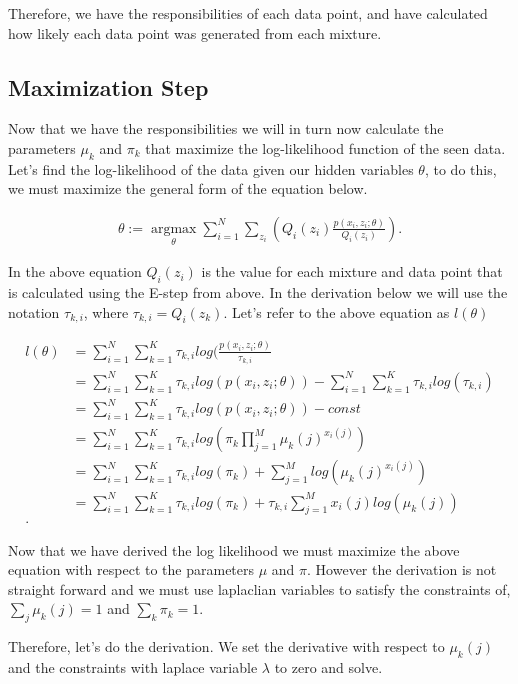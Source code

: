 \documentclass[paper=a4, fontsize=11pt]{scrartcl} %
\begin{document}
Therefore, we have the responsibilities of each data point, and have calculated how likely each data point was generated from each mixture.

\subsection{Maximization Step}
Now that we have the responsibilities we will in turn now calculate the parameters $\mu_k$ and $\pi_k$ that maximize the log-likelihood function of the seen data.
Let's find the log-likelihood of the data given our hidden variables $\theta$, to do this, we must maximize the general form of the equation below.

\begin{align}
\theta := \underset{\theta}{\operatorname{argmax}}\sum_{i=1}^N \sum_{z_i}(Q_i(z_i)\frac{p(x_i,z_i;\theta)}{Q_i(z_i)}).
\end{align}

In the above equation $Q_i(z_i)$ is the value for each mixture and data point that is calculated using the E-step from above.
In the derivation below we will use the notation $\tau_{k,i}$, where $\tau_{k,i} = Q_i(z_k)$.
Let's refer to the above equation as $l(\theta)$

\begin{align}
l(\theta) &= \sum_{i=1}^N \sum_{k=1}^K \tau_{k,i} log(\frac{p(x_i,z_i;\theta)}{\tau_{k,i}} \\
&= \sum_{i=1}^N \sum_{k=1}^K \tau_{k,i} log(p(x_i,z_i;\theta)) -  \sum_{i=1}^N \sum_{k=1}^K \tau_{k,i} log( \tau_{k,i}) \\
&= \sum_{i=1}^N \sum_{k=1}^K \tau_{k,i} log(p(x_i,z_i;\theta)) -  const \\
&=  \sum_{i=1}^N \sum_{k=1}^K \tau_{k,i} log( \pi_k\prod_{j=1}^M \mu_k(j)^{x_i(j)}) \\
&= \sum_{i=1}^N \sum_{k=1}^K \tau_{k,i} log(\pi_k) + \sum_{j=1}^M log(\mu_k(j)^{x_i(j)}) \\
&= \sum_{i=1}^N \sum_{k=1}^K \tau_{k,i} log(\pi_k) + \tau_{k,i}\sum_{j=1}^M x_i(j) log(\mu_k(j)) \\.
\end{align}

Now that we have derived the log likelihood we must maximize the above equation with respect to the parameters $\mu$ and $\pi$.
However the derivation is not straight forward and we must use laplaclian variables to satisfy the constraints of, $\sum_j \mu_k(j) = 1$ and $\sum_k \pi_k = 1$.

Therefore, let's do the derivation.
We set the derivative with respect to $\mu_k(j)$ and the constraints with laplace variable $\lambda$ to zero and solve.
\end{document}
